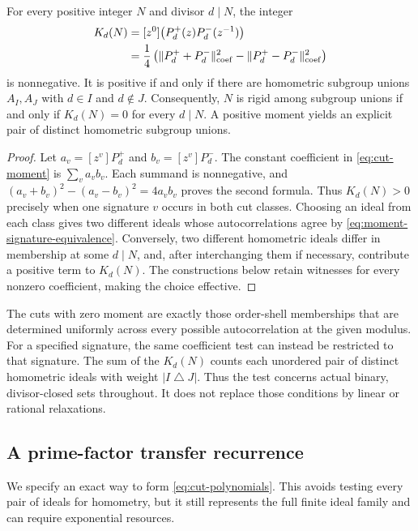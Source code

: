 \begin{theorem}\label{thm:cut-coefficient}
For every positive integer $N$ and divisor $d\mid N$, the integer
\begin{align}
 K_d(N)&=[z^0]\bigl(P_d^+(z)P_d^-(z^{-1})\bigr)\label{eq:cut-moment}\\
 &=\frac14\left(
 \|P_d^++P_d^-\|_{\mathrm{coef}}^2-
 \|P_d^+-P_d^-\|_{\mathrm{coef}}^2\right)\notag
\end{align}
is nonnegative.  It is positive if and only if there are homometric subgroup
unions $A_I,A_J$ with $d\in I$ and $d\notin J$.  Consequently, $N$ is rigid
among subgroup unions if and only if $K_d(N)=0$ for every $d\mid N$.
A positive moment yields an explicit pair of distinct homometric subgroup
unions.
\end{theorem}
\begin{proof}
Let $a_v=[z^v]P_d^+$ and $b_v=[z^v]P_d^-$.  The constant coefficient in
\eqref{eq:cut-moment} is $\sum_v a_vb_v$.  Each summand is nonnegative,
and $(a_v+b_v)^2-(a_v-b_v)^2=4a_vb_v$ proves the second formula.
Thus $K_d(N)>0$ precisely when one signature $v$ occurs in both cut classes.
Choosing an ideal from each class gives two different ideals whose
autocorrelations agree by \eqref{eq:moment-signature-equivalence}.
Conversely, two different homometric ideals differ in membership at some
$d\mid N$, and, after interchanging them if necessary, contribute a positive
term to $K_d(N)$.  The constructions below retain witnesses for every
nonzero coefficient, making the choice effective.
\end{proof}

The cuts with zero moment are exactly those order-shell memberships that are determined uniformly across every possible autocorrelation at the given modulus. For a specified signature, the same coefficient test can instead be restricted to that signature.  The sum of
the $K_d(N)$ counts each unordered pair of distinct homometric ideals with
weight $|I\mathbin\triangle J|$.  Thus the test concerns actual binary,
divisor-closed sets throughout.  It does not replace those conditions by
linear or rational relaxations.

\subsection{A prime-factor transfer recurrence}

We specify an exact way to form \eqref{eq:cut-polynomials}.  This avoids
testing every pair of ideals for homometry, but it still represents the full
finite ideal family and can require exponential resources.


